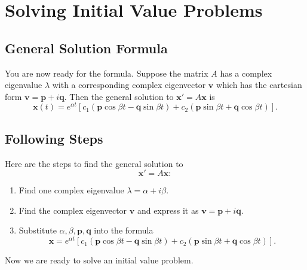 \documentclass[11pt,letterpaper]{article}
\begin{document}

\section{Solving Initial Value Problems}

\subsection{General Solution Formula}
You are now ready for the formula. Suppose the matrix $A$ has a complex eigenvalue $\lambda$ with a corresponding complex eigenvector $\textbf{v}$ which has the cartesian form $\textbf{v} = \textbf{p}+i \textbf{q}.$
Then the general solution to $\textbf{x}'=A\textbf{x}$ is
$$
\boxed{
\mathbf{x}(t)
=e^{\alpha t}\left[c_1
(\mathbf{p}\cos\beta t-\mathbf{q}\sin\beta t)+c_2
(\mathbf{p}\sin\beta t+\mathbf{q}\cos\beta t)
\right].
}
$$

\subsection{Following Steps}
Here are the steps to find the general solution to 
$$
\textbf{x}' = A\textbf{x}:
$$
\begin{enumerate}
    \item Find one complex eigenvalue $\lambda=\alpha+i\beta$.
    \item Find the complex eigenvector $\textbf{v}$ and express it as  $\textbf{v}=\textbf{p}+i\textbf{q}$.
    \item Substitute $\alpha,\beta,\textbf{p},\textbf{q}$ into the formula
    $$
    \textbf{x}=e^{\alpha t}\left[c_1
(\mathbf{p}\cos\beta t-\mathbf{q}\sin\beta t)+c_2
(\mathbf{p}\sin\beta t+\mathbf{q}\cos\beta t)
\right].
    $$
\end{enumerate}
Now we are ready to solve an initial value problem.

\end{document}
